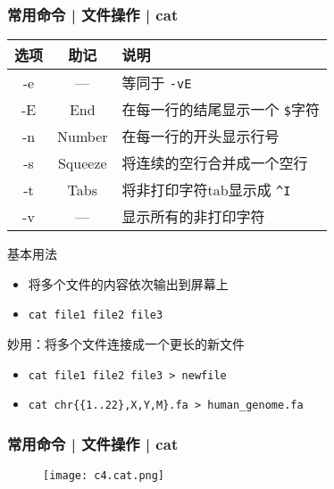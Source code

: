 \begin{frame}[fragile]
  \frametitle{常用命令 | 文件操作 | cat}
  \begin{table}
    \centering
    \begin{tabularx}{0.9\textwidth}{ccX}
      \hline
      \rowcolor{blue!50}选项 & 助记 & 说明\\
      \hline
      -e & --- & 等同于 \verb|-vE|\\
      -E & End & 在每一行的结尾显示一个 \verb|$|字符\\
      -n & Number & 在每一行的开头显示行号\\
      -s & Squeeze & 将连续的空行合并成一个空行\\
      -t & Tabs & 将非打印字符tab显示成 \verb|^I|\\
      -v & --- & 显示所有的非打印字符\\
      \hline
    \end{tabularx}
  \end{table}
  \vspace{-0.5em}
  \pause
  \begin{block}{基本用法}
    \begin{itemize}
      \item 将多个文件的内容依次输出到屏幕上
      \item \verb|cat file1 file2 file3|
    \end{itemize}
  \end{block}
  \vspace{-0.5em}
  \pause
  \begin{block}{\alert{妙用：将多个文件连接成一个更长的新文件}}
    \begin{itemize}
      \item \verb|cat file1 file2 file3 > newfile|
      \item \verb|cat chr{{1..22},X,Y,M}.fa > human_genome.fa|
    \end{itemize}
  \end{block}
\end{frame}

\begin{frame}[fragile]
  \frametitle{常用命令 | 文件操作 | cat}
  \begin{figure}
    \centering
    \texttt{[image: c4.cat.png]}
  \end{figure}
\end{frame}

